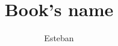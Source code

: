 \documentclass[12pt,letterpaper]{book}
\title{Book's name}
\author{Esteban}
\begin{document}
\maketitle
\tableofcontents


\chapter{}




 
\end{document}
